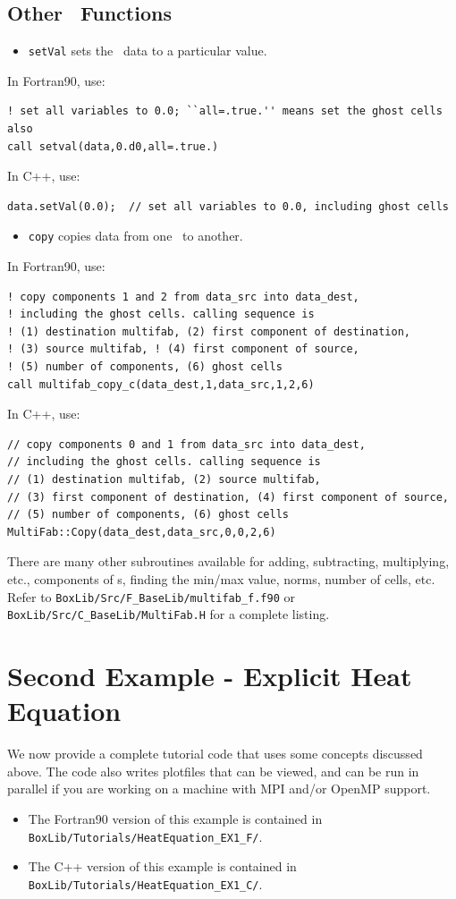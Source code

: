 \subsection{Other \MultiFab\ Functions}
\begin{itemize}
\item {\tt setVal} sets the \MultiFab\ data to a particular value.
\end{itemize}
In Fortran90, use:
\begin{lstlisting}[backgroundcolor=\color{light-green}]
! set all variables to 0.0; ``all=.true.'' means set the ghost cells also
call setval(data,0.d0,all=.true.)
\end{lstlisting}
In C++, use:
\begin{lstlisting}[backgroundcolor=\color{light-blue}]
data.setVal(0.0);  // set all variables to 0.0, including ghost cells
\end{lstlisting}
\begin{itemize}
\item {\tt copy} copies data from one \MultiFab\ to another.
\end{itemize}
In Fortran90, use:
\begin{lstlisting}[backgroundcolor=\color{light-green}]
! copy components 1 and 2 from data_src into data_dest, 
! including the ghost cells. calling sequence is 
! (1) destination multifab, (2) first component of destination, 
! (3) source multifab, ! (4) first component of source, 
! (5) number of components, (6) ghost cells
call multifab_copy_c(data_dest,1,data_src,1,2,6)
\end{lstlisting}
In C++, use:
\begin{lstlisting}[backgroundcolor=\color{light-blue}]
// copy components 0 and 1 from data_src into data_dest, 
// including the ghost cells. calling sequence is 
// (1) destination multifab, (2) source multifab, 
// (3) first component of destination, (4) first component of source, 
// (5) number of components, (6) ghost cells
MultiFab::Copy(data_dest,data_src,0,0,2,6)
\end{lstlisting}
There are many other subroutines available for adding, subtracting, multiplying, etc.,
components of \MultiFab s, finding the min/max value, norms, number of cells, etc.
Refer to {\tt BoxLib/Src/F\_BaseLib/multifab\_f.f90} or 
{\tt BoxLib/Src/C\_BaseLib/MultiFab.H} for a complete listing.

\section{Second Example - Explicit Heat Equation}
We now provide a complete tutorial code that uses some concepts discussed above.
The code also writes plotfiles that can be viewed, and can be run in parallel if you
are working on a machine with MPI and/or OpenMP support.
\begin{itemize}
\item The Fortran90 version of this example is contained in {\tt BoxLib/Tutorials/HeatEquation\_EX1\_F/}.
\item The C++ version of this example is contained in {\tt BoxLib/Tutorials/HeatEquation\_EX1\_C/}.
\end{itemize}

